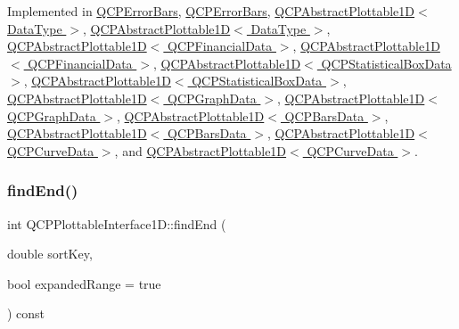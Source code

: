 Implemented in \hyperlink{class_q_c_p_error_bars_a5c74b510f1d7254263ec18cd3a359a07}{Q\+C\+P\+Error\+Bars}, \hyperlink{class_q_c_p_error_bars_aad74fa52d2471f23677faff1d8697cee}{Q\+C\+P\+Error\+Bars}, \hyperlink{class_q_c_p_abstract_plottable1_d_ae6ead74a0d6a17954e1857f361b9ccf2}{Q\+C\+P\+Abstract\+Plottable1\+D$<$ Data\+Type $>$}, \hyperlink{class_q_c_p_abstract_plottable1_d_ae8206cf770f180e01d0a02e998d4e788}{Q\+C\+P\+Abstract\+Plottable1\+D$<$ Data\+Type $>$}, \hyperlink{class_q_c_p_abstract_plottable1_d_ae6ead74a0d6a17954e1857f361b9ccf2}{Q\+C\+P\+Abstract\+Plottable1\+D$<$ Q\+C\+P\+Financial\+Data $>$}, \hyperlink{class_q_c_p_abstract_plottable1_d_ae8206cf770f180e01d0a02e998d4e788}{Q\+C\+P\+Abstract\+Plottable1\+D$<$ Q\+C\+P\+Financial\+Data $>$}, \hyperlink{class_q_c_p_abstract_plottable1_d_ae6ead74a0d6a17954e1857f361b9ccf2}{Q\+C\+P\+Abstract\+Plottable1\+D$<$ Q\+C\+P\+Statistical\+Box\+Data $>$}, \hyperlink{class_q_c_p_abstract_plottable1_d_ae8206cf770f180e01d0a02e998d4e788}{Q\+C\+P\+Abstract\+Plottable1\+D$<$ Q\+C\+P\+Statistical\+Box\+Data $>$}, \hyperlink{class_q_c_p_abstract_plottable1_d_ae6ead74a0d6a17954e1857f361b9ccf2}{Q\+C\+P\+Abstract\+Plottable1\+D$<$ Q\+C\+P\+Graph\+Data $>$}, \hyperlink{class_q_c_p_abstract_plottable1_d_ae8206cf770f180e01d0a02e998d4e788}{Q\+C\+P\+Abstract\+Plottable1\+D$<$ Q\+C\+P\+Graph\+Data $>$}, \hyperlink{class_q_c_p_abstract_plottable1_d_ae6ead74a0d6a17954e1857f361b9ccf2}{Q\+C\+P\+Abstract\+Plottable1\+D$<$ Q\+C\+P\+Bars\+Data $>$}, \hyperlink{class_q_c_p_abstract_plottable1_d_ae8206cf770f180e01d0a02e998d4e788}{Q\+C\+P\+Abstract\+Plottable1\+D$<$ Q\+C\+P\+Bars\+Data $>$}, \hyperlink{class_q_c_p_abstract_plottable1_d_ae6ead74a0d6a17954e1857f361b9ccf2}{Q\+C\+P\+Abstract\+Plottable1\+D$<$ Q\+C\+P\+Curve\+Data $>$}, and \hyperlink{class_q_c_p_abstract_plottable1_d_ae8206cf770f180e01d0a02e998d4e788}{Q\+C\+P\+Abstract\+Plottable1\+D$<$ Q\+C\+P\+Curve\+Data $>$}.

\mbox{\label{class_q_c_p_plottable_interface1_d_a5deced1016bc55a41a2339619045b295}} 
\subsubsection{\texorpdfstring{find\+End()}{findEnd()}}
{\footnotesize\ttfamily int Q\+C\+P\+Plottable\+Interface1\+D\+::find\+End (\begin{DoxyParamCaption}\item[{double}]{sort\+Key,  }\item[{bool}]{expanded\+Range = {\ttfamily true} }\end{DoxyParamCaption}) const\hspace{0.3cm}{\ttfamily [pure virtual]}}


